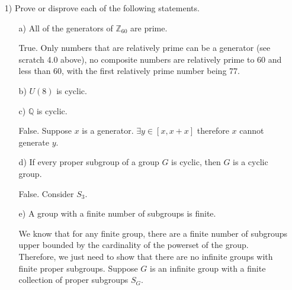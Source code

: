 \documentclass[11pt]{article}
\begin{document}
\begin{itemize}
    \item[1)] Prove or disprove each of the following statements.
    \begin{itemize}
        \item [a)]All of the generators of $\mathbb{Z}_{60}$ are prime.
        \begin{solution}
            True. Only numbers that are relatively prime can be a generator (see scratch 4.0 above), no composite numbers are relatively prime to 60 and less than 60, with the first relatively prime number being 77.
        \end{solution}
        \item [b)] $U(8)$ is cyclic.
        \item [c)]$\mathbb{Q}$ is cyclic.
        \begin{solution}
            False. Suppose $x$ is a generator. $\exists y\in [x,x+x]$ therefore $x$ cannot generate $y$.
        \end{solution}
        \item [d)]If every proper subgroup of a group $G$ is cyclic, then $G$ is a cyclic group.
        \begin{solution}
            False. Consider $S_3$.
        \end{solution}
        \item [e)]A group with a finite number of subgroups is finite.
        \begin{solution}
            We know that for any finite group, there are a finite number of subgroups upper bounded by the cardinality of the powerset of the group.\\
            Therefore, we just need to show that there are no infinite groups with finite proper subgroups. Suppose $G$ is an infinite group with a finite collection of proper subgroups $S_G$.
        \end{solution}


\end{itemize}
\end{itemize}
\end{document}
